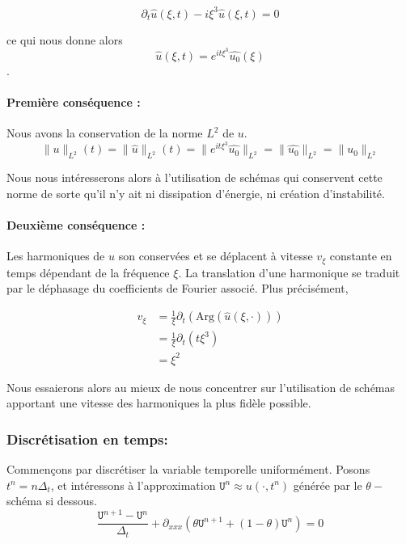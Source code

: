 \documentclass[12pt,a4paper]{article}
\numberwithin{equation}{section}
\begin{document}
\begin{equation*}
    \partial_t\hat{u}(\xi, t) - i\xi^3\hat{u}(\xi, t) = 0
\end{equation*}

ce qui nous donne alors
\begin{equation*}
    \hat{u}(\xi, t) = e^{it\xi^3}\hat{u_0}(\xi)
\end{equation*}.

\paragraph{Première conséquence :} Nous avons la conservation de la norme $L^2$ de $u$.
\begin{equation}
    \|u\|_{L^2}(t) = \|\hat{u}\|_{L^2}(t) =\|e^{it\xi^3}\hat{u_0}\|_{L^2} =  \|\hat{u_0}\|_{L^2} =  \|u_0\|_{L^2} 
\end{equation}

Nous nous intéresserons alors à l'utilisation de schémas qui conservent cette norme de sorte qu'il n'y ait ni dissipation d'énergie, ni création d'instabilité.

\paragraph{Deuxième conséquence :} Les harmoniques de $u$ son conservées et se déplacent à vitesse $v_\xi$ constante en temps dépendant de la fréquence $\xi$. La translation d'une harmonique se traduit par le déphasage du coefficients de Fourier associé. Plus précisément, 

\begin{equation}
\begin{split}
    v_\xi &= \frac{1}{\xi}\partial_t (\text{Arg}(\hat{u}(\xi,\cdot)))
    \\ &= \frac{1}{\xi}\partial_t (t\xi^3) 
    \\ &= \xi^2
\end{split}
\end{equation}

Nous essaierons alors au mieux de nous concentrer sur l'utilisation de schémas apportant une vitesse des harmoniques la plus fidèle possible.

\subsubsection{ Discrétisation en temps: }
Commençons par discrétiser la variable temporelle uniformément. Posons $t^n = n\Delta_t$, et intéressons à l'approximation $\texttt{U}^n \approx u(\cdot,t^n)$ générée par le $\theta-$schéma si dessous.
\begin{equation}
\frac{\texttt{U}^{n+1}-\texttt{U}^n}{\Delta_t} + \partial_{xxx}(\theta\texttt{U}^{n+1} + (1-\theta)\texttt{U}^{n}) = 0 \label{num_theta_scheme_Airy}
\end{equation}
\end{document}
